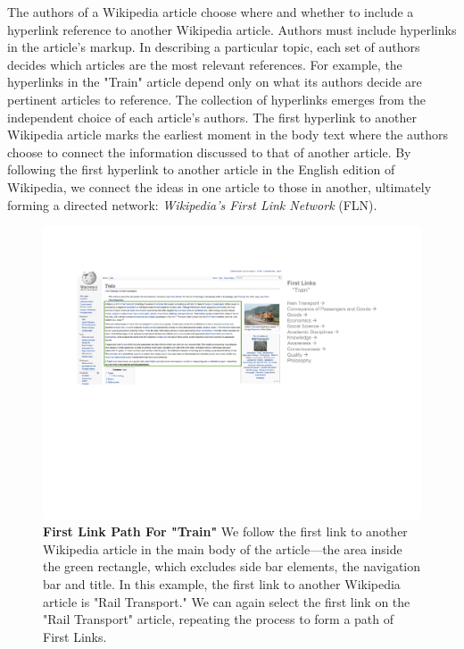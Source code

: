 \documentclass[pre,twocolumn,twoside,superscriptaddress,floatfix, aps, 10pt]{revtex4-1}
\begin{document}
The authors of a Wikipedia article choose where and whether to include a 
hyperlink reference to another Wikipedia article.
Authors must include hyperlinks in the article's markup.
In describing a particular topic, each set of authors decides which articles are the most
relevant references.
For example, the hyperlinks in the "Train" article depend only on what its authors 
decide are pertinent articles to reference.
The collection of hyperlinks emerges from the independent choice of each article's authors. 
The first hyperlink to another Wikipedia article marks the earliest moment in the body text where the authors
choose to connect the information discussed to that of another article.
By following the first hyperlink to another article in the English edition of
Wikipedia, we connect the ideas in one article to those in another, ultimately forming a directed network: 
{\it Wikipedia's First Link Network} (FLN).

\begin{figure}[tp!]
  \centering	
  \includegraphics[width=\textwidth]{graphics/Train.pdf}  
  \caption{
    \textbf{First Link Path For "Train"}
    We follow the first link to another Wikipedia article
    in the main body of the article---the area
    inside the green rectangle, which excludes 
    side bar elements, the navigation bar and title. 
    In this example, the first link to another Wikipedia article is "Rail Transport." 
    We can again select the first link on the "Rail Transport"
    article, repeating the process to 
    form a path of First Links.
  }
  \label{fig:Train First Links}
\end{figure}
\end{document}
